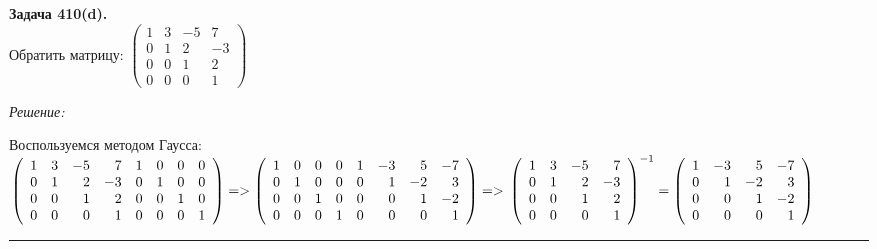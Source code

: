 \documentclass[a4paper, 12pt]{article}
\newenvironment{problem}[2][Задача]
    { \begin{mdframed}[backgroundcolor=gray!10] \textbf{#1 #2.} \\}
    {  \end{mdframed}}
\newenvironment{solution}
    {\textit{Решение: }}
    {\noindent\rule{7in}{1.5pt}}
\begin{document}
\begin{problem}{410(d)}
Обратить матрицу:
$\left(\begin{array}{rrrr}1 & 3 & -5 & 7\\0 & 1 & 2 & -3\\ 0 & 0 & 1 & 2 \\ 0 & 0 & 0 & 1\end{array}\right)$

\end{problem}
\begin{solution}

Воспользуемся методом Гаусса: \\
$
\left(
\begin{array}{rrrrrrrr}
1 & 3 & -5 & 7 & 1 & 0 & 0 & 0 \\
0 & 1 & 2 & -3 & 0 & 1 & 0 & 0 \\
0 & 0 & 1 & 2  & 0 & 0 & 1 & 0 \\
0 & 0 & 0 & 1  & 0 & 0 & 0 & 1
\end{array}
\right)
=>
\left(
\begin{array}{rrrrrrrr}
1 & 0 & 0 & 0 & 1 & -3 & 5 & -7 \\
0 & 1 & 0 & 0 & 0 & 1 & -2 & 3 \\
0 & 0 & 1 & 0  & 0 & 0 & 1 & -2 \\
0 & 0 & 0 & 1  & 0 & 0 & 0 & 1
\end{array}
\right)
=> \\
\left(
\begin{array}{rrrr}
1 & 3 & -5 & 7 \\
0 & 1 & 2 & -3 \\
0 & 0 & 1 & 2 \\
0 & 0 & 0 & 1
\end{array}
\right)^{-1}
=
\left(
\begin{array}{rrrr}
1 & -3 & 5 & -7 \\
0 & 1 & -2 & 3 \\
0 & 0 & 1 & -2 \\
0 & 0 & 0 & 1
\end{array}
\right)
$

\end{solution}
\end{document}
